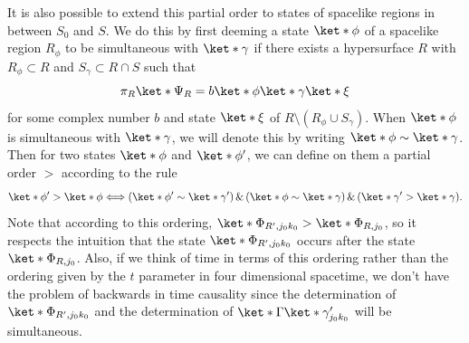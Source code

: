 \documentclass[12pt]{report}
\begin{document}
It is also possible to extend this partial order to states of spacelike regions in between $S_0$ and $S$. We do this by first deeming a state $\ket*{\phi}$ of a spacelike region $R_\phi$ to be simultaneous with $\ket*{\gamma}$ if there exists a hypersurface $R$ with $R_\phi\subset R$ and $S_\gamma \subset R\cap S$ such that 
$$\pi_R\ket*{\Psi_R}=b\ket*{\phi}\ket*{\gamma}\ket*{\xi}$$ 
for some complex number $b$ and state $\ket*{\xi}$ of $R\setminus(R_\phi\cup S_\gamma)$. When $\ket*{\phi}$  is simultaneous with  $\ket*{\gamma}$, we will denote this by writing 
$\ket*{\phi}\sim \ket*{\gamma}$. %
%
Then for two states $\ket*{\phi}$ and $\ket*{\phi'}$, we can define on them a partial order $>$ according to the rule
\begin{equation}
\ket*{\phi'}>\ket*{\phi}\Longleftrightarrow 
(\ket*{\phi'}\sim\ket*{\gamma'}) \,\&\, (\ket*{\phi}\sim\ket*{\gamma})\, \&\, (\ket*{\gamma'}>\ket*{\gamma}).
\end{equation}
Note that according to this ordering, $\ket*{\Phi_{R', j_0k_0}}>\ket*{\Phi_{R,j_0}}$, so it respects the intuition that the state $\ket*{\Phi_{R', j_0k_0}}$ occurs after the state $\ket*{\Phi_{R,j_0}}$. Also, if we think of time in terms of this ordering rather than the ordering given by the $t$ parameter in four dimensional spacetime, we don't have the problem of backwards in time causality since the determination of $\ket*{\Phi_{R', j_0k_0}}$ and the determination of $\ket*{\Gamma}\ket*{\gamma_{j_0k_0}'}$ will be simultaneous. 
\end{document}

